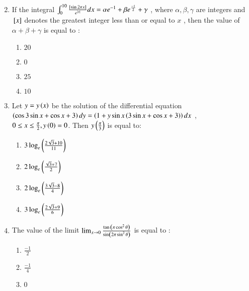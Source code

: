\documentclass[journal,12pt,onecolumn]{IEEEtran}
\theoremstyle{remark}
\begin{document}
\begin{enumerate}
\begin{multicols}{2}
\begin{enumerate}
       \end{enumerate}
   \end{multicols}
   \item If the integral $\int_0^{10} \frac{{}\left[\sin{2\pi x}\right]}{e^{\left\vert x\right\vert}} dx = \alpha{e^{-1}} + \beta{e^{\frac{-1}{2}}} + \gamma$ , where $\alpha  , \beta , \gamma$ are integers and ${}\left[x\right]$ denotes the greatest integer less than or equal to $x$ , then the value of $\alpha + \beta + \gamma$ is equal to : 
   \begin{multicols}{2}
       \begin{enumerate}
           \item $20$
           \item $0$\\
           \item $25$
           \item $10$
       \end{enumerate}
   \end{multicols}
   \item Let $y = y\left(x\right)$ be the solution of the differential equation \\$\left(\cos{3\sin{x} + \cos{x} + 3 }\right)dy = \left(1 + y\sin{x}\left(3\sin{x}+ \cos{x} +3\right)\right)dx$ , $0 \leq x \leq \frac{\pi}{2}, y\left(0\right)=0$.
   Then $y\left(\frac{\pi}{3}\right)$ is equal to:
   \begin{multicols}{2}
       \begin{enumerate}
           \item $3\log_e \left(\frac{2\sqrt{3}+10}{11}\right)$\\
           \item $2\log_e \left(\frac{\sqrt{3}+7}{2}\right)$
           \item $2\log_e \left(\frac{3\sqrt{3}-8}{4}\right)$\\
           \item $3\log_e \left(\frac{2\sqrt{3}+9}{6}\right)$
       \end{enumerate}
   \end{multicols}
   \item The value of the limit $\lim_{x \to 0} \frac{\tan{\ensuremath{\left(\pi \cos^2{\theta}\right)}}}{\sin \left(2 \pi \sin^2{\theta}\right)}$ is equal to :
   \begin{multicols}{2}
   \begin{enumerate}
       \item $\frac{-1}{2}$\\
       \item $\frac{-1}{4}$
       \item $0$\\

\end{enumerate}
\end{multicols}
\end{enumerate}
\end{document}
